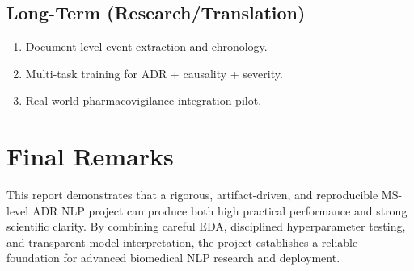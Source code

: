 \documentclass[11pt]{article}
\begin{document}
\subsection{Long-Term (Research/Translation)}

\begin{enumerate}
  \item Document-level event extraction and chronology.
  \item Multi-task training for ADR + causality + severity.
  \item Real-world pharmacovigilance integration pilot.
\end{enumerate}

\section{Final Remarks}

This report demonstrates that a rigorous, artifact-driven, and reproducible MS-level ADR NLP project can produce both high practical performance and strong scientific clarity. By combining careful EDA, disciplined hyperparameter testing, and transparent model interpretation, the project establishes a reliable foundation for advanced biomedical NLP research and deployment.
\end{document}
